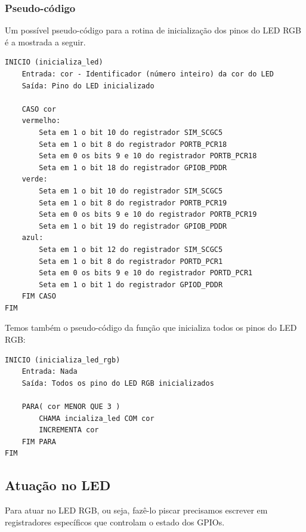 \documentclass{article}
\begin{document}
\subsubsection{Pseudo-código}

Um possível pseudo-código para a rotina de inicialização dos pinos do LED RGB é a mostrada a seguir.

\begin{verbatim}
INICIO (inicializa_led)
    Entrada: cor - Identificador (número inteiro) da cor do LED
    Saída: Pino do LED inicializado

    CASO cor
    vermelho:
        Seta em 1 o bit 10 do registrador SIM_SCGC5
        Seta em 1 o bit 8 do registrador PORTB_PCR18
        Seta em 0 os bits 9 e 10 do registrador PORTB_PCR18
        Seta em 1 o bit 18 do registrador GPIOB_PDDR
    verde:
        Seta em 1 o bit 10 do registrador SIM_SCGC5
        Seta em 1 o bit 8 do registrador PORTB_PCR19
        Seta em 0 os bits 9 e 10 do registrador PORTB_PCR19
        Seta em 1 o bit 19 do registrador GPIOB_PDDR
    azul:
        Seta em 1 o bit 12 do registrador SIM_SCGC5
        Seta em 1 o bit 8 do registrador PORTD_PCR1
        Seta em 0 os bits 9 e 10 do registrador PORTD_PCR1
        Seta em 1 o bit 1 do registrador GPIOD_PDDR
    FIM CASO
FIM
\end{verbatim}

Temos também o pseudo-código da função que inicializa todos os pinos do LED RGB:
\begin{verbatim}
INICIO (inicializa_led_rgb)
    Entrada: Nada
    Saída: Todos os pino do LED RGB inicializados

    PARA( cor MENOR QUE 3 )
        CHAMA incializa_led COM cor
        INCREMENTA cor
    FIM PARA
FIM
\end{verbatim}


\subsection{Atuação no LED}
Para atuar no LED RGB, ou seja, fazê-lo piscar precisamos escrever em registradores específicos que controlam o estado dos GPIOs.
\end{document}
